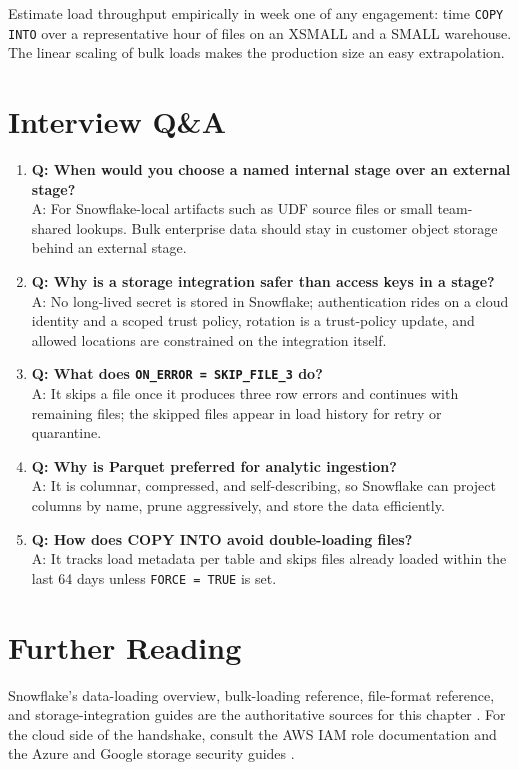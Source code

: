 \begin{tipbox}
Estimate load throughput empirically in week one of any engagement: time \texttt{COPY INTO} over a representative hour of files on an XSMALL and a SMALL warehouse. The linear scaling of bulk loads makes the production size an easy extrapolation.
\end{tipbox}

\section{Interview Q\&A}
\begin{enumerate}
    \item \textbf{Q: When would you choose a named internal stage over an external stage?}\\
    A: For Snowflake-local artifacts such as UDF source files or small team-shared lookups. Bulk enterprise data should stay in customer object storage behind an external stage.
    \item \textbf{Q: Why is a storage integration safer than access keys in a stage?}\\
    A: No long-lived secret is stored in Snowflake; authentication rides on a cloud identity and a scoped trust policy, rotation is a trust-policy update, and allowed locations are constrained on the integration itself.
    \item \textbf{Q: What does \texttt{ON\_ERROR = SKIP\_FILE\_3} do?}\\
    A: It skips a file once it produces three row errors and continues with remaining files; the skipped files appear in load history for retry or quarantine.
    \item \textbf{Q: Why is Parquet preferred for analytic ingestion?}\\
    A: It is columnar, compressed, and self-describing, so Snowflake can project columns by name, prune aggressively, and store the data efficiently.
    \item \textbf{Q: How does COPY INTO avoid double-loading files?}\\
    A: It tracks load metadata per table and skips files already loaded within the last 64 days unless \texttt{FORCE = TRUE} is set.
\end{enumerate}

\section{Further Reading}
Snowflake's data-loading overview, bulk-loading reference, file-format reference, and storage-integration guides are the authoritative sources for this chapter \cite{snowflakeDataLoadDocs,snowflakeCopyIntoDocs,snowflakeFileFormatsDocs,snowflakeStorageIntegrationsDocs}. For the cloud side of the handshake, consult the AWS IAM role documentation and the Azure and Google storage security guides \cite{awsIamRoleDocs,azureBlobSecurityDocs,googleCloudStorageIamDocs}.

